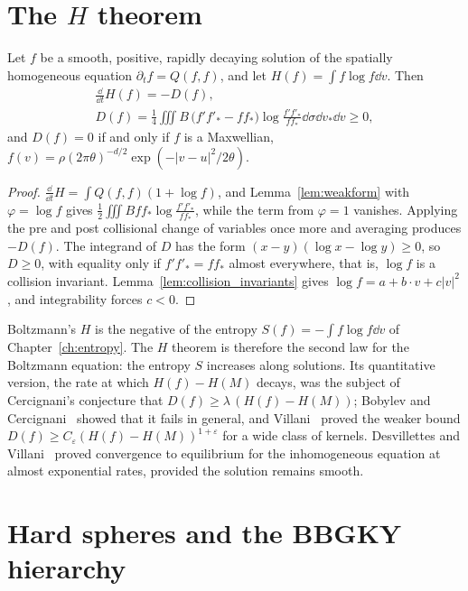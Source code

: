 \section{The \texorpdfstring{$H$}{H} theorem}

\begin{theorem}[Boltzmann]
\label{thm:htheorem}
Let $f$ be a smooth, positive, rapidly decaying solution of the spatially homogeneous equation $\partial_tf = Q(f,f)$, and let $H(f) = \int f\log f\dd v$. Then
\begin{gather*}
\frac{\dd}{\dd t}H(f) = -D(f), \\
D(f) = \frac14\iiint B\,\big(f'f'_*-ff_*\big)\log\frac{f'f'_*}{ff_*}\dd\sigma\dd v_*\dd v\geq0,
\end{gather*}
and $D(f) = 0$ if and only if $f$ is a Maxwellian, $f(v) = \rho(2\pi\theta)^{-d/2}\exp(-|v-u|^2/2\theta)$.
\end{theorem}

\begin{proof}
$\frac{\dd}{\dd t}H = \int Q(f,f)(1+\log f)$, and Lemma~\ref{lem:weakform} with $\varphi = \log f$ gives $\frac12\iiint Bff_*\log\frac{f'f'_*}{ff_*}$, while the term from $\varphi = 1$ vanishes. Applying the pre and post collisional change of variables once more and averaging produces $-D(f)$. The integrand of $D$ has the form $(x-y)(\log x-\log y)\geq0$, so $D\geq0$, with equality only if $f'f'_* = ff_*$ almost everywhere, that is, $\log f$ is a collision invariant. Lemma~\ref{lem:collision_invariants} gives $\log f = a+b\cdot v+c|v|^2$, and integrability forces $c<0$.
\end{proof}

Boltzmann's $H$ is the negative of the entropy $S(f) = -\int f\log f\dd v$ of Chapter~\ref{ch:entropy}. The $H$ theorem is therefore the second law for the Boltzmann equation: the entropy $S$ increases along solutions. Its quantitative version, the rate at which $H(f)-H(M)$ decays, was the subject of Cercignani's conjecture that $D(f)\geq\lambda\,(H(f)-H(M))$; Bobylev and Cercignani~\cite{bobylevcercignani1999} showed that it fails in general, and Villani~\cite{villani2003cercignani} proved the weaker bound $D(f)\geq C_\varepsilon(H(f)-H(M))^{1+\varepsilon}$ for a wide class of kernels. Desvillettes and Villani~\cite{desvillettesvillani2005} proved convergence to equilibrium for the inhomogeneous equation at almost exponential rates, provided the solution remains smooth.

\section{Hard spheres and the BBGKY hierarchy}

